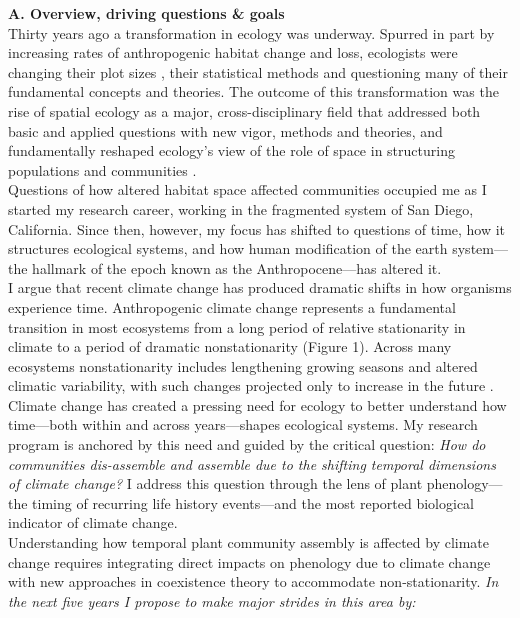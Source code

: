 \documentclass[12pt,a4paper,oneside]{article}
\begin{document}
{\bf A. Overview, driving questions \& goals}
\vspace{1.5ex}\\
Thirty years ago a transformation in ecology was underway. Spurred in part by increasing rates of anthropogenic habitat change and loss, ecologists were changing their plot sizes \citep[][]{Soule:1992pw,Terborgh:2001bw}, their statistical methods \citep{legendre1993} and questioning many of their fundamental concepts and theories. The outcome of this transformation was the rise of spatial ecology as a major, cross-disciplinary field that addressed both basic and applied questions with new vigor, methods and theories, and fundamentally reshaped ecology's view of the role of space in structuring populations and communities \citep{Doak:1989oc,Turner1989}.
\vspace{1.5ex}\\
Questions of how altered habitat space affected communities occupied me as I started my research career, working in the fragmented system of San Diego, California. Since then, however, my focus has shifted to questions of time, how it structures ecological systems, and how human modification of the earth system---the hallmark of the epoch known as the Anthropocene---has altered it.
\vspace{1.5ex}\\
I argue that recent climate change \citep[at least partially associated with increases in anthropogenic greenhouse gases, see][]{Trenberth:2007hk} has produced dramatic shifts in how organisms experience time. Anthropogenic climate change represents a fundamental transition in most ecosystems from a long period of relative stationarity in climate to a period of dramatic nonstationarity (Figure 1). Across many ecosystems nonstationarity includes lengthening growing seasons and altered climatic variability, with such changes projected only to increase in the future \citep{knutti2013}. Climate change has created a pressing need for ecology to better understand how time---both within and across years---shapes ecological systems. My research program is anchored by this need and guided by the critical question: \emph{How do communities dis-assemble and assemble due to the shifting temporal dimensions of climate change?} I address this question through the lens of plant phenology---the timing of recurring life history events---and the most reported biological indicator of climate change.
\vspace{1.5ex}\\
Understanding how temporal plant community assembly is affected by climate change requires integrating direct impacts on phenology due to climate change with new approaches in coexistence theory to accommodate non-stationarity. \emph{In the next five years I propose to make major strides in this area by:}
\end{document}
